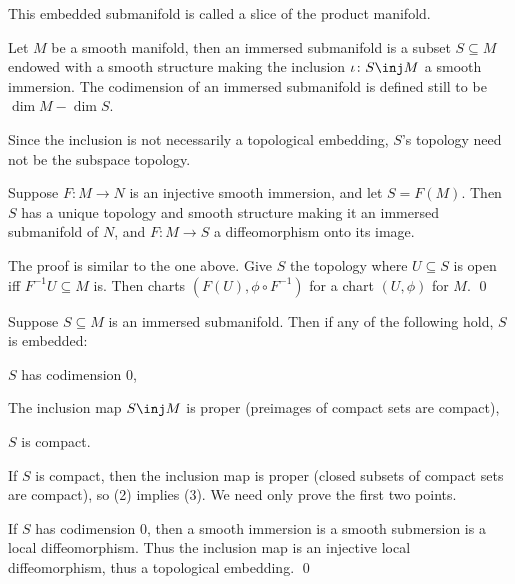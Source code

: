     This embedded submanifold is called a {\emphcolor slice} of the product manifold.

\eexam

\bdefn

    Let $M$ be a smooth manifold, then an {\emphcolor immersed submanifold} is a subset $S\subseteq M$ endowed with a
    smooth structure making the inclusion $\iota\colon S\inj M$ a smooth immersion.
    The {\emphcolor codimension} of an immersed submanifold is defined still to be $\dim M-\dim S$.

\edefn

Since the inclusion is not necessarily a topological embedding, $S$'s topology need not be the subspace topology.

\bprop

    Suppose $F\colon M\to N$ is an injective smooth immersion, and let $S=F(M)$.
    Then $S$ has a unique topology and smooth structure making it an immersed submanifold of $N$, and $F\colon M\to S$
    a diffeomorphism onto its image.

\eprop

\bproof

    The proof is similar to the one above.
    Give $S$ the topology where $U\subseteq S$ is open iff $F^{-1}U\subseteq M$ is.
    Then charts $(F(U),\phi\circ F^{-1})$ for a chart $(U,\phi)$ for $M$.
    \qed

\eproof

\bprop

    Suppose $S\subseteq M$ is an immersed submanifold.
    Then if any of the following hold, $S$ is embedded:
    \benum
        \item $S$ has codimension $0$,
        \item The inclusion map $S\inj M$ is proper (preimages of compact sets are compact),
        \item $S$ is compact.
    \eenum

\eprop

\bproof

    If $S$ is compact, then the inclusion map is proper (closed subsets of compact sets are compact), so (2) implies (3).
    We need only prove the first two points.

    If $S$ has codimension $0$, then a smooth immersion is a smooth submersion is a local diffeomorphism.
    Thus the inclusion map is an injective local diffeomorphism, thus a topological embedding.
    \qed

\eproof

